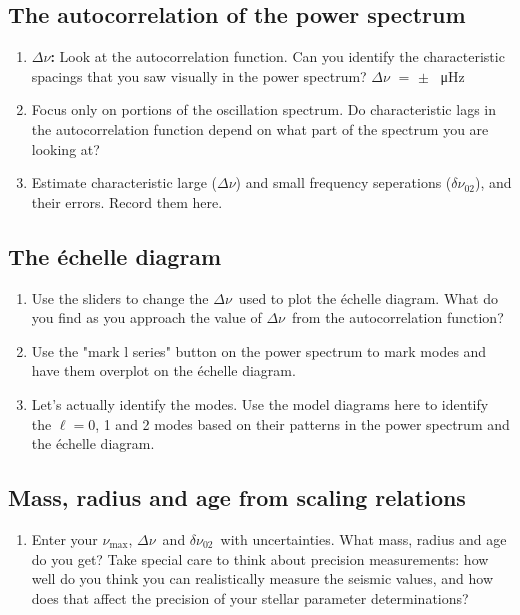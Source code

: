 \documentclass[11pt]{article}
\newcommand{\numax}{\ensuremath{\nu_\mathrm{max}}}
\newcommand{\dnu}{\ensuremath{\Delta\nu}}
\newcommand{\dnuzt}{\ensuremath{\delta\nu_{02}}}
\newcommand{\uHz}{\si{\micro\hertz}}
\newcommand{\answer}[1][3cm]{\par\vspace{#1}}
\newcommand{\fillin}[2]{#1 $=$ \underline{\hspace{3cm}} $\pm$ \underline{\hspace{2cm}}\ #2}
\begin{document}
\subsection*{The autocorrelation of the power spectrum}
\begin{enumerate}[resume=ps]
  \item \textbf{\dnu:} Look at the autocorrelation function. Can you identify the characteristic spacings that you saw visually in the power spectrum? 
        \fillin{\dnu}{\uHz}
        \answer[2.5cm]
  \item Focus only on portions of the oscillation spectrum. Do characteristic lags in the autocorrelation function depend on what part of the spectrum you are looking at? 
        \answer[2cm]
  \item Estimate characteristic large (\dnu) and small frequency seperations (\dnuzt), and their errors. Record them here. 
       \answer[1cm]      
\end{enumerate}

\subsection*{The \'echelle diagram}

\begin{enumerate}[resume=ps]
  \item Use the sliders to change the \dnu\ used to plot the  \'echelle diagram. What do you find as you approach the value of \dnu\ from the autocorrelation function?
          \answer
  \item Use the "mark l series" button on the power spectrum to mark modes and have them overplot on the  \'echelle diagram.  
           \answer      
  \item Let's actually identify the modes. Use the model diagrams here to identify the  $\ell = 0$, 1 and 2 modes based on their patterns in the power spectrum and the \'echelle diagram.
          \answer
\end{enumerate}

\subsection*{Mass, radius and age from scaling relations}

\begin{enumerate}[resume=ps]
  \item Enter your \numax, \dnu\ and \dnuzt\ with uncertainties. What mass, radius and age
        do you get? Take special care to think about precision measurements: how well do you think you can realistically measure the seismic values, and how does that affect the precision of your stellar parameter determinations?
        \answer
\end{enumerate}
\end{document}
